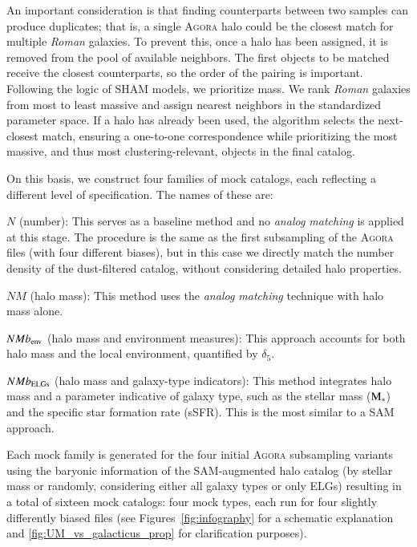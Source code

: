 \documentclass[]{aa} %
\begin{document}
 An important consideration is that finding counterparts between two samples can produce duplicates; that is, a single \textsc{Agora} halo could be the closest match for multiple \emph{Roman} galaxies. To prevent this, once a halo has been assigned, it is removed from the pool of available neighbors. The first objects to be matched receive the closest counterparts, so the order of the pairing is important. Following the logic of SHAM models, we prioritize mass. We rank \emph{Roman} galaxies from most to least massive and assign nearest neighbors in the standardized parameter space. If a halo has already been used, the algorithm selects the next-closest match, ensuring a one-to-one correspondence while prioritizing the most massive, and thus most clustering-relevant, objects in the final catalog.

On this basis, we construct four families of mock catalogs, each reflecting a different level of specification. The names of these are: 

\begin{list}{}{}
	\item [\textbullet] {$N$ (number)}: This serves as a baseline method and no \emph{analog matching} is applied at this stage. The procedure is the same as the first subsampling of the \textsc{Agora} files (with four different biases), but in this case we directly match the number density of the dust-filtered catalog, without considering detailed halo properties.
	\item [\textbullet] {$N M$ (halo mass)}: This method uses the \emph{analog matching} technique with halo mass alone.
	\item [\textbullet] {$N M b_{\rm env}$ (halo mass and environment measures)}: This approach accounts for both halo mass and the local environment, quantified by $\delta_5$.
	\item [\textbullet] {$N M b_{\rm ELGs}$ (halo mass and galaxy-type indicators)}: This method integrates halo mass and a parameter indicative of galaxy type, such as the stellar mass ($\rm M_{*}$) and the specific star formation rate (sSFR). This is the most similar to a SAM approach.
\end{list}

Each mock family is generated for the four initial \textsc{Agora} subsampling variants using the baryonic information of the SAM-augmented halo catalog (by stellar mass or randomly, considering either all galaxy types or only ELGs) resulting in a total of sixteen mock catalogs: four mock types, each run for four slightly differently biased files (see Figures~\ref{fig:infography} for a schematic explanation and \ref{fig:UM_vs_galacticus_prop} for clarification purposes).
\end{document}
